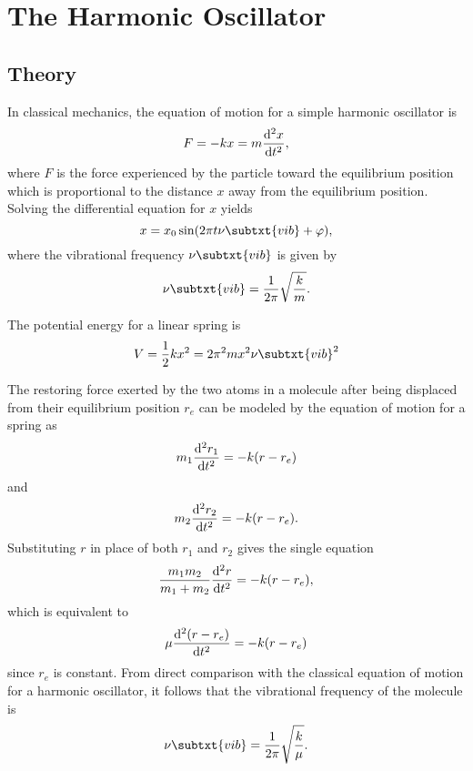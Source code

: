 \section{The Harmonic Oscillator}
\label{s:the_harmonic_oscillator}

\subsection{Theory}

In classical mechanics, the equation of motion for a simple harmonic oscillator is
\begin{equation*}
    F = -kx = m\odv[2]{x}{t},
\end{equation*}
where $F$ is the force experienced by the particle toward the equilibrium position which is proportional to the distance $x$ away from the equilibrium position. Solving the differential equation for $x$ yields
\begin{equation*}
    x = x_{0}\sin(2\pi t\nu\subtxt{vib} + \varphi),
\end{equation*}
where the vibrational frequency $\nu\subtxt{vib}$ is given by
\begin{equation*}
    \nu\subtxt{vib} = \frac{1}{2\pi}\sqrt{\frac{k}{m}}.
\end{equation*}

The potential energy for a linear spring is
\begin{equation*}
    V = \frac{1}{2}kx^{2} = 2\pi^{2}mx^{2}\nu\subtxt{vib}^{2}
\end{equation*}

The restoring force exerted by the two atoms in a molecule after being displaced from their equilibrium position $r_{e}$ can be modeled by the equation of motion for a spring as
\begin{equation*}
    m_{1}\odv[2]{r_{1}}{t} = -k(r - r_{e})
\end{equation*}
and
\begin{equation*}
    m_{2}\odv[2]{r_{2}}{t} = -k(r - r_{e}).
\end{equation*}
Substituting $r$ in place of both $r_{1}$ and $r_{2}$ gives the single equation
\begin{equation*}
    \frac{m_{1}m_{2}}{m_{1} + m_{2}}\odv[2]{r}{t} = -k(r - r_{e}),
\end{equation*}
which is equivalent to
\begin{equation*}
    \mu\odv[2]{(r - r_{e})}{t} = -k(r - r_{e})
\end{equation*}
since $r_{e}$ is constant. From direct comparison with the classical equation of motion for a harmonic oscillator, it follows that the vibrational frequency of the molecule is
\begin{equation*}
    \nu\subtxt{vib} = \frac{1}{2\pi}\sqrt{\frac{k}{\mu}}.
\end{equation*}

